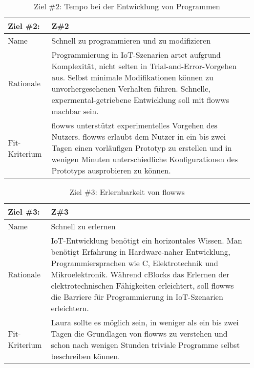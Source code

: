 \begin{table}[H]
\caption{Ziel \#2: Tempo bei der Entwicklung von Programmen}
\label{tab:ziel2}
\begin{tabularx}{\textwidth}{lX}
\hline
\rowcolor[HTML]{EFEFEF} 
Ziel \#2:     & Z\#2 \\ \hline
Name          & Schnell zu programmieren und zu modifizieren\\ \hline
Rationale     & Programmierung in IoT-Szenarien artet aufgrund Komplexität, nicht selten in Trial-and-Error-Vorgehen aus. Selbst minimale Modifikationen können zu unvorhergesehenen Verhalten führen. Schnelle, expermental-getriebene Entwicklung soll mit flowws machbar sein.\\ \hline
Fit-Kriterium & flowws unterstützt experimentelles Vorgehen des Nutzers. flowws erlaubt dem Nutzer in ein bis zwei Tagen einen vorläufigen Prototyp zu erstellen und in wenigen Minuten unterschiedliche Konfigurationen des Prototyps ausprobieren zu können. \\ \hline
\end{tabularx}
\end{table}

\begin{table}[H]
\caption{Ziel \#3: Erlernbarkeit von flowws}
\label{tab:ziel1}
\begin{tabularx}{\textwidth}{lX}
\hline
\rowcolor[HTML]{EFEFEF} 
Ziel \#3:     & Z\#3   \\ \hline
Name          & Schnell zu erlernen \\ \hline
Rationale     & IoT-Entwicklung benötigt ein horizontales Wissen. Man benötigt Erfahrung in Hardware-naher Entwicklung, Programmiersprachen wie C, Elektrotechnik und Mikroelektronik. Während cBlocks das Erlernen der elektrotechnischen Fähigkeiten erleichtert, soll flowws die Barriere für Programmierung in IoT-Szenarien erleichtern. \\ \hline
Fit-Kriterium & Laura sollte es möglich sein, in weniger als ein bis zwei Tagen die Grundlagen von flowws zu verstehen und schon nach wenigen Stunden triviale Programme selbst beschreiben können. \\ \hline
\end{tabularx}
\end{table}




